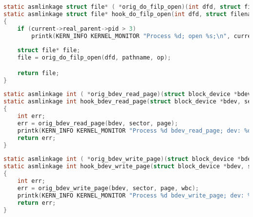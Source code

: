     \begin{lstlisting}[language=C, label=lst:ftrace-hooking:do_filp_open, caption=Функция-обёртка функции do\_filp\_open]
static asmlinkage struct file* ( *orig_do_filp_open)(int dfd, struct filename *pathname, const struct open_flags *op);
static asmlinkage struct file* hook_do_filp_open(int dfd, struct filename *pathname, const struct open_flags *op)
{
    if (current->real_parent->pid > 3)
        printk(KERN_INFO KERNEL_MONITOR "Process %d; open %s;\n", current->pid, pathname->name);
    
    struct file* file;
    file = orig_do_filp_open(dfd, pathname, op);

    return file;
}
    \end{lstlisting}


    \begin{lstlisting}[language=C, label=lst:ftrace-hooking:bdev_read_page, caption=Функция-обёртка функции bdev\_read\_page]
static asmlinkage int ( *orig_bdev_read_page)(struct block_device *bdev, sector_t sector, struct page *page);
static asmlinkage int hook_bdev_read_page(struct block_device *bdev, sector_t sector, struct page *page)
{
    int err;
    err = orig_bdev_read_page(bdev, sector, page);
    printk(KERN_INFO KERNEL_MONITOR "Process %d bdev_read_page; dev: %d\n", current->pid, bdev->bd_dev);
    return err;
}
    \end{lstlisting}

    \begin{lstlisting}[language=C, label=lst:ftrace-hooking:bdev_write_page, caption=Функция-обёртка функции bdev\_write\_page]
static asmlinkage int ( *orig_bdev_write_page)(struct block_device *bdev, sector_t sector, struct page *page, struct writeback_control *wbc);
static asmlinkage int hook_bdev_write_page(struct block_device *bdev, sector_t sector, struct page *page, struct writeback_control *wbc)
{
    int err;
    err = orig_bdev_write_page(bdev, sector, page, wbc);
    printk(KERN_INFO KERNEL_MONITOR "Process %d bdev_write_page; dev: %d\n", current->pid, bdev->bd_dev);
    return err;
}
    \end{lstlisting}


\pagebreak